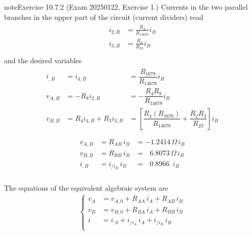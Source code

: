 \documentclass[letterpaper,10pt,italian]{jupyterBook}
\begin{document}
\begin{sphinxadmonition}{note}{Exercise 10.7.2 (Exam 2025\sphinxhyphen{}01\sphinxhyphen{}22, Exercise 1.)}
\sphinxAtStartPar
Currents in the two parallel branches in the upper part of the circuit (current dividers) read
\begin{equation*}
\begin{split}\begin{aligned}
  i_{2,B} & = \frac{R_4}{R_{14678}} i_B \\
  i_{3,B} & = \frac{R_2}{R_{23}} i_B \\
\end{aligned}\end{split}
\end{equation*}
\sphinxAtStartPar
and the desired variables
\begin{equation*}
\begin{split}\begin{aligned}
  i_{,B}  & = i_{4,B} & = \dfrac{R_{1678}}{R_{14678}} i_B \\
  v_{A,B} & = - R_8 i_{2,B} & = - \dfrac{R_4 R_8}{R_{14678}} i_B  \\
  v_{B,B} & = R_4 i_{4,B} + R_3 i_{3,B} & = \left[ \dfrac{R_4(R_{1678})}{R_{14678}} + \dfrac{R_2 R_3}{R_{23}} \right] i_B \\
\end{aligned}\end{split}
\end{equation*}\begin{equation*}
\begin{split}\begin{aligned}
 v_{A,B} & = R_{AB}   \, i_B & =     - 1.2414  \, \Omega \, i_B \\ 
 v_{B,B} & = R_{BB}   \, i_B & = \ \ \ 6.8073  \, \Omega \, i_B \\
   i_{,B}& = i_{/i_B} \, i_B & = \ \ \ 0.8966 \ \          i_B \\
\end{aligned}\end{split}
\end{equation*}
\begin{figure}[htbp]
\centering

\noindent{}
\end{figure}

\sphinxAtStartPar
The equations of the equivalent algebraic system are
\begin{equation*}
\begin{split}\begin{cases}
 v_A & = v_{A,0} + R_{AA}   \, i_A + R_{AB}   \, i_B \\
 v_B & = v_{B,0} + R_{BA}   \, i_A + R_{BB}   \, i_B \\
 i   & = i_{ ,0} + i_{/i_A} \, i_A + i_{/i_B} \, i_B \\
\end{cases}\end{split}
\end{equation*}



\end{sphinxadmonition}
\end{document}

